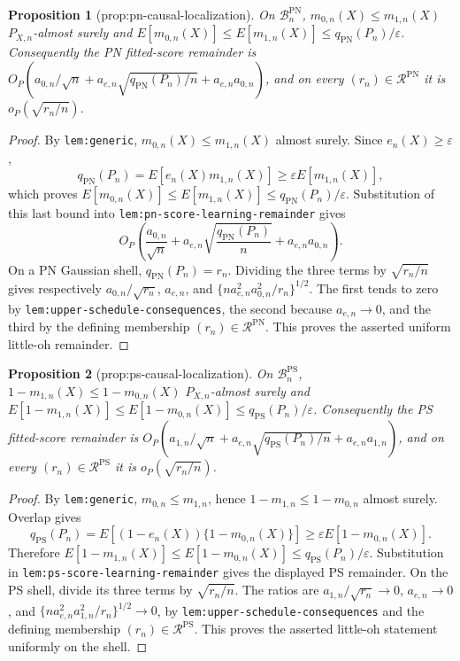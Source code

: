 \documentclass{article}
\newtheorem{proposition}{Proposition}
\begin{document}
\begin{proposition}[prop:pn-causal-localization]\label{prop:pn-causal-localization}
On \(\mathcal B_n^{\mathrm{PN}}\), \(m_{0,n}(X)\le m_{1,n}(X)\) \(P_{X,n}\)-almost surely and \(E[m_{0,n}(X)]\le E[m_{1,n}(X)]\le q_{\mathrm{PN}}(P_n)/\varepsilon\). Consequently the PN fitted-score remainder is \(O_P(a_{0,n}/\sqrt n+a_{e,n}\sqrt{q_{\mathrm{PN}}(P_n)/n}+a_{e,n}a_{0,n})\), and on every \((r_n)\in\mathcal R^{\mathrm{PN}}\) it is \(o_P(\sqrt{r_n/n})\).
\end{proposition}
\begin{proof}
By \texttt{lem:generic}, \(m_{0,n}(X)\le m_{1,n}(X)\) almost surely. Since \(e_n(X)\ge\varepsilon\),
\[q_{\mathrm{PN}}(P_n)=E[e_n(X)m_{1,n}(X)]\ge\varepsilon E[m_{1,n}(X)],\]
which proves \(E[m_{0,n}(X)]\le E[m_{1,n}(X)]\le q_{\mathrm{PN}}(P_n)/\varepsilon\). Substitution of this last bound into \texttt{lem:pn-score-learning-remainder} gives
\[O_P\!\left(\frac{a_{0,n}}{\sqrt n}+a_{e,n}\sqrt{\frac{q_{\mathrm{PN}}(P_n)}n}+a_{e,n}a_{0,n}\right).\]
On a PN Gaussian shell, \(q_{\mathrm{PN}}(P_n)=r_n\). Dividing the three terms by \(\sqrt{r_n/n}\) gives respectively \(a_{0,n}/\sqrt{r_n}\), \(a_{e,n}\), and \(\{na_{e,n}^2a_{0,n}^2/r_n\}^{1/2}\). The first tends to zero by \texttt{lem:upper-schedule-consequences}, the second because \(a_{e,n}\to0\), and the third by the defining membership \((r_n)\in\mathcal R^{\mathrm{PN}}\). This proves the asserted uniform little-oh remainder.
\end{proof}

\begin{proposition}[prop:ps-causal-localization]\label{prop:ps-causal-localization}
On \(\mathcal B_n^{\mathrm{PS}}\), \(1-m_{1,n}(X)\le1-m_{0,n}(X)\) \(P_{X,n}\)-almost surely and \(E[1-m_{1,n}(X)]\le E[1-m_{0,n}(X)]\le q_{\mathrm{PS}}(P_n)/\varepsilon\). Consequently the PS fitted-score remainder is \(O_P(a_{1,n}/\sqrt n+a_{e,n}\sqrt{q_{\mathrm{PS}}(P_n)/n}+a_{e,n}a_{1,n})\), and on every \((r_n)\in\mathcal R^{\mathrm{PS}}\) it is \(o_P(\sqrt{r_n/n})\).
\end{proposition}
\begin{proof}
By \texttt{lem:generic}, \(m_{0,n}\le m_{1,n}\), hence \(1-m_{1,n}\le1-m_{0,n}\) almost surely. Overlap gives
\[q_{\mathrm{PS}}(P_n)=E[(1-e_n(X))\{1-m_{0,n}(X)\}]\ge\varepsilon E[1-m_{0,n}(X)].\]
Therefore \(E[1-m_{1,n}(X)]\le E[1-m_{0,n}(X)]\le q_{\mathrm{PS}}(P_n)/\varepsilon\). Substitution in \texttt{lem:ps-score-learning-remainder} gives the displayed PS remainder. On the PS shell, divide its three terms by \(\sqrt{r_n/n}\). The ratios are \(a_{1,n}/\sqrt{r_n}\to0\), \(a_{e,n}\to0\), and \(\{na_{e,n}^2a_{1,n}^2/r_n\}^{1/2}\to0\), by \texttt{lem:upper-schedule-consequences} and the defining membership \((r_n)\in\mathcal R^{\mathrm{PS}}\). This proves the asserted little-oh statement uniformly on the shell.
\end{proof}
\end{document}

